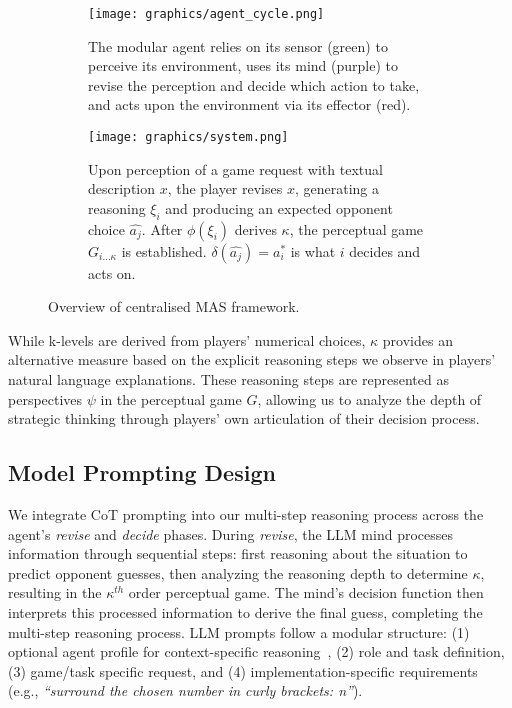 \documentclass[runningheads]{llncs}
\begin{document}
\begin{figure}[tb]
\centering
\begin{subfigure}{0.35\linewidth}
  \centering
  \texttt{[image: graphics/agent\_cycle.png]}
  \caption{The modular agent relies on its sensor (green) to perceive its environment, uses its mind (purple) to revise the perception and decide which action to take, and acts upon the environment via its effector (red).}
  \label{fig:agent-cycle-a}
\end{subfigure}
\hfill
\begin{subfigure}{0.625\linewidth}
  \centering
  \texttt{[image: graphics/system.png]}
  \caption{Upon perception of a game request with textual description $x$, the player revises $x$, generating a reasoning $\xi_i$ and producing an expected opponent choice $\hat{a_{j}}$. After $\phi(\xi_i)$ derives $\kappa$, the perceptual game $G_{i\ldots \kappa}$ is established. $\delta(\hat{a_{j}})=a^*_i$ is what $i$ decides and acts on.}
  \label{fig:agent-cycle-b}
\end{subfigure}
\caption{Overview of centralised MAS framework.}
\label{fig:agent-cycle}
\end{figure}

While k-levels are derived from players' numerical choices, $\kappa$ provides an alternative measure based on the explicit reasoning steps we observe in players' natural language explanations. These reasoning steps are represented as perspectives $\psi$ in the perceptual game $G$, allowing us to analyze the depth of strategic thinking through players' own articulation of their decision process.

\subsection{Model Prompting Design}

We integrate CoT prompting into our multi-step reasoning process across the agent's \textit{revise} and \textit{decide} phases. During \textit{revise}, the LLM mind processes information through sequential steps: first reasoning about the situation to predict opponent guesses, then analyzing the reasoning depth to determine $\kappa$, resulting in the $\kappa^{th}$ order perceptual game. The mind's decision function then interprets this processed information to derive the final guess, completing the multi-step reasoning process. LLM prompts follow a modular structure: (1) optional agent profile for context-specific reasoning~\cite{mao2024alympicsllmagentsmeet}, (2) role and task definition, (3) game/task specific request, and (4) implementation-specific requirements (e.g., \textit{``surround the chosen number in curly brackets: {n}''}).
\end{document}

